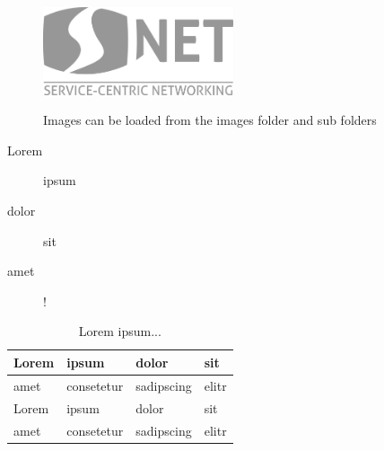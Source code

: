 

\begin{figure}[!ht]
	\centering
	\includegraphics[width=0.5\textwidth]{images/snet_logo_gray.png}\\
	\caption{Images can be loaded from the images folder and sub folders}
	\label{fig:introduction__loremipsum}
\end{figure}


\begin{description}
	\item[Lorem] ipsum
	\item[dolor] sit
	\item[amet] !
\end{description}

\begin{table}[!ht]
	\small
	\centering
	\begin{tabular}{|l|l|l|l|}
		\hline
		Lorem & ipsum & dolor & sit \\
		\hline
		amet & consetetur & sadipscing & elitr \\
		\hline
		Lorem & ipsum & dolor & sit \\
		\hline
		amet & consetetur & sadipscing & elitr \\
		\hline
	\end{tabular}
	\caption{Lorem ipsum...}
\end{table}

\lstset{style=JSONStyle}
\begin{lstlisting}[language=PHP, caption=did:web DID Document, label=fig:did_web_doc, float=h]
 
\end{lstlisting}